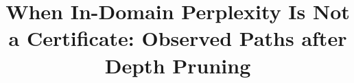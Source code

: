 \documentclass[11pt]{article}
\title{When In-Domain Perplexity Is Not a Certificate:
Observed Paths after Depth Pruning}
\author{}
\begin{document}
\maketitle








\FloatBarrier

\FloatBarrier

\clearpage



\clearpage


\clearpage
\appendix
\raggedbottom

\end{document}

